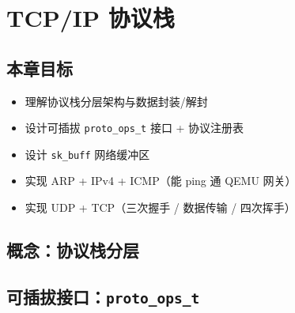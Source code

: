 \chapter{TCP/IP 协议栈}
\label{ch:tcpip}

\section{本章目标}

\begin{itemize}
  \item 理解协议栈分层架构与数据封装/解封
  \item 设计可插拔 \texttt{proto\_ops\_t} 接口 + 协议注册表
  \item 设计 \texttt{sk\_buff} 网络缓冲区
  \item 实现 ARP + IPv4 + ICMP（能 ping 通 QEMU 网关）
  \item 实现 UDP + TCP（三次握手 / 数据传输 / 四次挥手）
\end{itemize}

\section{概念：协议栈分层}
\label{sec:tcpip-concept}


\section{可插拔接口：\texttt{proto\_ops\_t}}
\label{sec:tcpip-interface}



